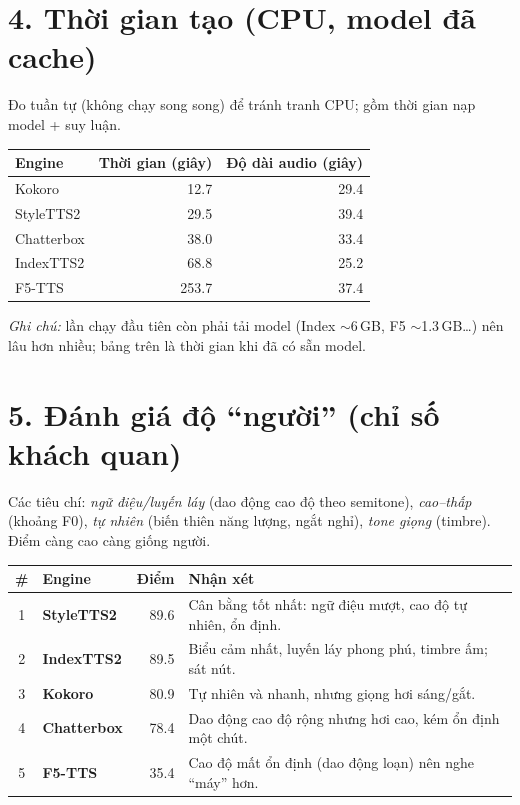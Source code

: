 \documentclass[11pt]{article}
\begin{document}
\section*{4. Thời gian tạo (CPU, model đã cache)}
Đo tuần tự (không chạy song song) để tránh tranh CPU; gồm thời gian nạp model + suy luận.
\begin{table}[H]\centering
\begin{tabular}{l r r}
\toprule
Engine & Thời gian (giây) & Độ dài audio (giây) \\
\midrule
Kokoro     & 12.7  & 29.4 \\
StyleTTS2  & 29.5  & 39.4 \\
Chatterbox & 38.0  & 33.4 \\
IndexTTS2  & 68.8  & 25.2 \\
F5-TTS     & 253.7 & 37.4 \\
\bottomrule
\end{tabular}
\end{table}
\noindent\textit{Ghi chú:} lần chạy đầu tiên còn phải tải model (Index $\sim$6\,GB, F5 $\sim$1.3\,GB\dots) nên lâu hơn nhiều; bảng trên là thời gian khi đã có sẵn model.

\section*{5. Đánh giá độ ``người'' (chỉ số khách quan)}
Các tiêu chí: \textit{ngữ điệu/luyến láy} (dao động cao độ theo semitone), \textit{cao--thấp}
(khoảng F0), \textit{tự nhiên} (biến thiên năng lượng, ngắt nghỉ), \textit{tone giọng} (timbre).
Điểm càng cao càng giống người.
\begin{table}[H]\centering
\begin{tabular}{c >{\bfseries}l r p{7.5cm}}
\toprule
\# & Engine & Điểm & Nhận xét \\
\midrule
1 & StyleTTS2  & 89.6 & Cân bằng tốt nhất: ngữ điệu mượt, cao độ tự nhiên, ổn định. \\
2 & IndexTTS2  & 89.5 & Biểu cảm nhất, luyến láy phong phú, timbre ấm; sát nút. \\
3 & Kokoro     & 80.9 & Tự nhiên và nhanh, nhưng giọng hơi sáng/gắt. \\
4 & Chatterbox & 78.4 & Dao động cao độ rộng nhưng hơi cao, kém ổn định một chút. \\
5 & F5-TTS     & 35.4 & Cao độ mất ổn định (dao động loạn) nên nghe ``máy'' hơn. \\
\bottomrule
\end{tabular}
\end{table}
\end{document}
